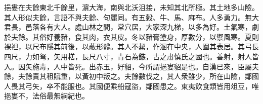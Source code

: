 \begin{pinyinscope}
 
 
 挹婁在夫餘東北千餘里，濵大海，南與北沃沮接，未知其北所極。其土地多山險。其人形似夫餘，言語不與夫餘、句麗同。有五糓、牛、馬、麻布。人多勇力。無大君長，邑落各有大人。處山林之間，常穴居，大家深九梯，以多為好。土氣寒，劇於夫餘。其俗好養豬，食其肉，衣其皮。冬以豬膏塗身，厚數分，以禦風寒。夏則裸袒，以尺布隱其前後，以蔽形體。其人不絜，作溷在中央，人圍其表居。其弓長四尺，力如弩，矢用楛，長尺八寸，青石為鏃，古之肅慎氏之國也。善射，射人皆入。因矢施毒，人中皆死。出赤玉，好貂，今所謂挹婁貂是也。自漢已來，臣屬夫餘，夫餘責其租賦重，以黃初中叛之。夫餘數伐之，其人衆雖少，所在山險，鄰國人畏其弓矢，卒不能服也。其國便乘船寇盜，鄰國患之。東夷飲食類皆用俎豆，唯挹婁不，法俗最無綱紀也。
 
 
\end{pinyinscope}
